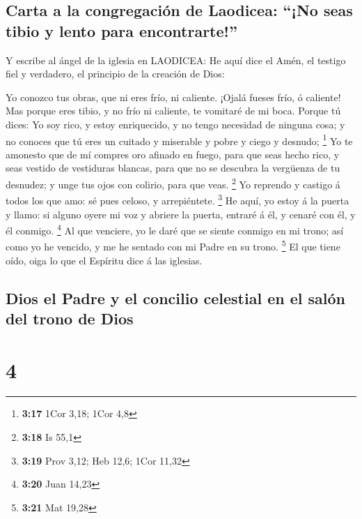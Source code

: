 \hypertarget{carta-a-la-congregaciuxf3n-de-laodicea-no-seas-tibio-y-lento-para-encontrarte}{%
\subsection{Carta a la congregación de Laodicea: ``¡No seas tibio y
lento para
encontrarte!''}\label{carta-a-la-congregaciuxf3n-de-laodicea-no-seas-tibio-y-lento-para-encontrarte}}

 Y escribe al ángel de la iglesia en LAODICEA: He aquí dice
el Amén, el testigo fiel y verdadero, el principio de la creación de
Dios:

 Yo conozco tus obras, que ni eres frío, ni caliente.
¡Ojalá fueses frío, ó caliente!  Mas porque eres tibio, y
no frío ni caliente, te vomitaré de mi boca.  Porque tú
dices: Yo soy rico, y estoy enriquecido, y no tengo necesidad de ninguna
cosa; y no conoces que tú eres un cuitado y miserable y pobre y ciego y
desnudo; \footnote{\textbf{3:17} 1Cor 3,18; 1Cor 4,8}  Yo
te amonesto que de mí compres oro afinado en fuego, para que seas hecho
rico, y seas vestido de vestiduras blancas, para que no se descubra la
vergüenza de tu desnudez; y unge tus ojos con colirio, para que veas.
\footnote{\textbf{3:18} Is 55,1}  Yo reprendo y castigo á
todos los que amo: sé pues celoso, y arrepiéntete. \footnote{\textbf{3:19}
  Prov 3,12; Heb 12,6; 1Cor 11,32}  He aquí, yo estoy á la
puerta y llamo: si alguno oyere mi voz y abriere la puerta, entraré á
él, y cenaré con él, y él conmigo. \footnote{\textbf{3:20} Juan 14,23}
 Al que venciere, yo le daré que se siente conmigo en mi
trono; así como yo he vencido, y me he sentado con mi Padre en su trono.
\footnote{\textbf{3:21} Mat 19,28}  El que tiene oído, oiga
lo que el Espíritu dice á las iglesias.

\hypertarget{dios-el-padre-y-el-concilio-celestial-en-el-saluxf3n-del-trono-de-dios}{%
\subsection{Dios el Padre y el concilio celestial en el salón del trono
de
Dios}\label{dios-el-padre-y-el-concilio-celestial-en-el-saluxf3n-del-trono-de-dios}}

\hypertarget{section-3}{%
\section{4}\label{section-3}}

